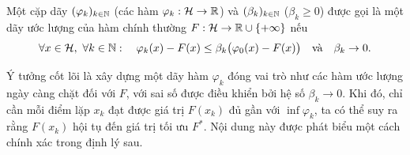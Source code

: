 \begin{definition}
\label{def:estimate-seq}
Một cặp dãy $(\varphi_k)_{k\in\mathbb{N}}$ (các hàm $\varphi_k:\mathcal{H}\to\mathbb{R}$) và
$(\beta_k)_{k\in\mathbb{N}}$ ($\beta_k\ge0$) được gọi là một dãy ước lượng
của hàm chính thường $F:\mathcal{H}\to\mathbb{R}\cup\{+\infty\}$ nếu
\begin{equation}
  \forall x\in\mathcal{H},\ \forall k\in\mathbb{N}:\quad
  \varphi_k(x) - F(x) \le \beta_k\big(\varphi_0(x)-F(x)\big)
  \quad\text{và}\quad \beta_k\to0.
  \label{eq:estimate-def}
\end{equation}
\end{definition}

\begin{essayonly}
Ý tưởng cốt lõi là xây dựng một dãy hàm ${\varphi_k}$ đóng vai trò như các hàm ước lượng ngày càng chặt đối với $F$, với sai số được điều khiển bởi hệ số $\beta_k \to 0$. Khi đó, chỉ cần mỗi điểm lặp $x_k$ đạt được giá trị $F(x_k)$ đủ gần với $\inf \varphi_k$, ta có thể suy ra rằng $F(x_k)$ hội tụ đến giá trị tối ưu $F^*$. Nội dung này được phát biểu một cách chính xác trong định lý sau.
\end{essayonly}

